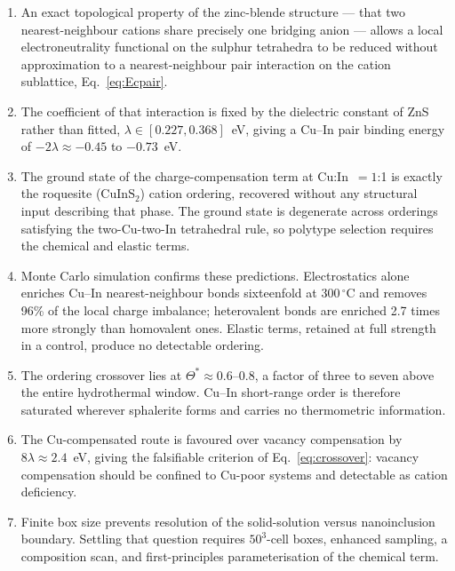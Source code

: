 \documentclass[11pt,a4paper]{article}
\begin{document}
\begin{enumerate}\itemsep3pt
\item An exact topological property of the zinc-blende structure --- that two
      nearest-neighbour cations share precisely one bridging anion --- allows a
      local electroneutrality functional on the sulphur tetrahedra to be reduced
      without approximation to a nearest-neighbour pair interaction on the
      cation sublattice, Eq.~\eqref{eq:Ecpair}.

\item The coefficient of that interaction is fixed by the dielectric constant of
      ZnS rather than fitted, $\lambda \in [0.227, 0.368]$~eV, giving a Cu--In
      pair binding energy of $-2\lambda \approx -0.45$ to $-0.73$~eV.

\item The ground state of the charge-compensation term at Cu:In~$=1$:1 is
      exactly the roquesite ($\mathrm{CuInS_2}$) cation ordering, recovered
      without any structural input describing that phase. The ground state is
      degenerate across orderings satisfying the two-Cu-two-In tetrahedral rule,
      so polytype selection requires the chemical and elastic terms.

\item Monte Carlo simulation confirms these predictions. Electrostatics alone
      enriches Cu--In nearest-neighbour bonds sixteenfold at $300\,^\circ$C and
      removes 96\% of the local charge imbalance; heterovalent bonds are
      enriched 2.7 times more strongly than homovalent ones. Elastic terms,
      retained at full strength in a control, produce no detectable ordering.

\item The ordering crossover lies at $\Theta^* \approx 0.6$--0.8, a factor of
      three to seven above the entire hydrothermal window. Cu--In short-range
      order is therefore saturated wherever sphalerite forms and carries no
      thermometric information.

\item The Cu-compensated route is favoured over vacancy compensation by
      $8\lambda \approx 2.4$~eV, giving the falsifiable criterion of
      Eq.~\eqref{eq:crossover}: vacancy compensation should be confined to
      Cu-poor systems and detectable as cation deficiency.

\item Finite box size prevents resolution of the solid-solution versus
      nanoinclusion boundary. Settling that question requires $50^3$-cell boxes,
      enhanced sampling, a composition scan, and first-principles
      parameterisation of the chemical term.
\end{enumerate}
\end{document}
